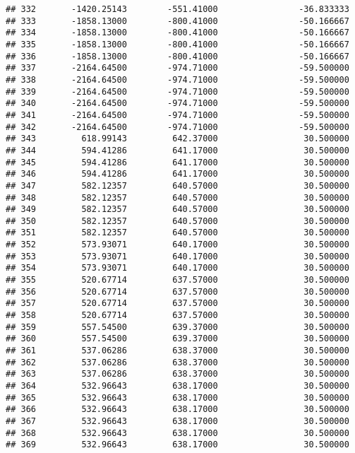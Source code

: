 \documentclass[]{article}
\begin{document}
\begin{verbatim}
## 332       -1420.25143        -551.41000                -36.833333
## 333       -1858.13000        -800.41000                -50.166667
## 334       -1858.13000        -800.41000                -50.166667
## 335       -1858.13000        -800.41000                -50.166667
## 336       -1858.13000        -800.41000                -50.166667
## 337       -2164.64500        -974.71000                -59.500000
## 338       -2164.64500        -974.71000                -59.500000
## 339       -2164.64500        -974.71000                -59.500000
## 340       -2164.64500        -974.71000                -59.500000
## 341       -2164.64500        -974.71000                -59.500000
## 342       -2164.64500        -974.71000                -59.500000
## 343         618.99143         642.37000                 30.500000
## 344         594.41286         641.17000                 30.500000
## 345         594.41286         641.17000                 30.500000
## 346         594.41286         641.17000                 30.500000
## 347         582.12357         640.57000                 30.500000
## 348         582.12357         640.57000                 30.500000
## 349         582.12357         640.57000                 30.500000
## 350         582.12357         640.57000                 30.500000
## 351         582.12357         640.57000                 30.500000
## 352         573.93071         640.17000                 30.500000
## 353         573.93071         640.17000                 30.500000
## 354         573.93071         640.17000                 30.500000
## 355         520.67714         637.57000                 30.500000
## 356         520.67714         637.57000                 30.500000
## 357         520.67714         637.57000                 30.500000
## 358         520.67714         637.57000                 30.500000
## 359         557.54500         639.37000                 30.500000
## 360         557.54500         639.37000                 30.500000
## 361         537.06286         638.37000                 30.500000
## 362         537.06286         638.37000                 30.500000
## 363         537.06286         638.37000                 30.500000
## 364         532.96643         638.17000                 30.500000
## 365         532.96643         638.17000                 30.500000
## 366         532.96643         638.17000                 30.500000
## 367         532.96643         638.17000                 30.500000
## 368         532.96643         638.17000                 30.500000
## 369         532.96643         638.17000                 30.500000

\end{verbatim}
\end{document}
